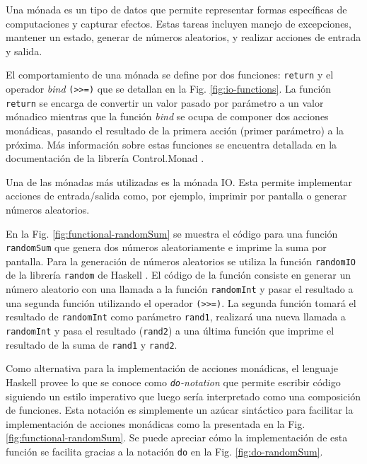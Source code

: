 Una mónada es un tipo de datos que permite representar formas específicas de computaciones y capturar efectos. Estas tareas incluyen manejo de excepciones, mantener un estado, generar de números aleatorios, y realizar acciones de entrada y salida.

El comportamiento de una mónada se define por dos funciones: \texttt{return} y el operador \emph{bind} \texttt{(>>=)} que se detallan en la Fig. \ref{fig:io-functions}.
La función \texttt{return} se encarga de convertir un valor pasado por parámetro a un valor mónadico mientras que la función \emph{bind} se ocupa de componer dos acciones monádicas, pasando el resultado de la primera acción (primer parámetro) a la próxima. Más información sobre estas funciones se encuentra detallada en la documentación de la librería Control.Monad \cite{control-monad}.

Una de las mónadas más utilizadas es la mónada IO. Esta permite implementar acciones de entrada/salida como, por ejemplo, imprimir por pantalla o generar números aleatorios.

En la Fig. \ref{fig:functional-randomSum} se muestra el código para una función \texttt{randomSum} que genera dos números aleatoriamente e imprime la suma por pantalla. Para la generación de números aleatorios se utiliza la función \texttt{randomIO} de la librería \texttt{random} de Haskell \cite{random}.
El código de la función consiste en generar un número aleatorio con una llamada a la función \texttt{randomInt} y pasar el resultado a una segunda función utilizando el operador \texttt{(>>=)}. La segunda función tomará el resultado de \texttt{randomInt} como parámetro \texttt{rand1}, realizará una nueva llamada a \texttt{randomInt} y pasa el resultado (\texttt{rand2}) a una última función que imprime el resultado de la suma de \texttt{rand1} y \texttt{rand2}.

Como alternativa para la implementación de acciones monádicas, el lenguaje Haskell  provee lo que se conoce como \emph{\texttt{do}-notation} que permite escribir código siguiendo un estilo imperativo que luego sería interpretado como una composición de funciones. Esta notación es simplemente un azúcar sintáctico para facilitar la implementación de acciones monádicas como la presentada en la Fig. \ref{fig:functional-randomSum}.
Se puede apreciar cómo la implementación de esta función se facilita gracias a la notación \texttt{do} en la Fig. \ref{fig:do-randomSum}.

